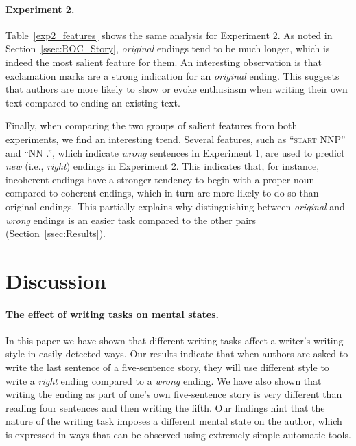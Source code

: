\documentclass[11pt,a4paper]{article}
\newcommand{\secref}[1]{Section~\ref{ssec:#1}}
\newcommand{\tabref}[1]{Table~\ref{#1}}
\newcommand{\isectionb}[1]{\section{#1}\label{ssec:#1}}
\begin{document}
\paragraph{Experiment 2.}
\tabref{exp2_features} shows the same analysis for Experiment 2.
As noted in \secref{ROC_Story}, {\it original} endings tend to be much longer, which is indeed the most salient feature for them.
An interesting observation is that exclamation marks are a strong
indication for an  {\it original} ending. 
This suggests that authors are more likely to show or evoke enthusiasm when writing their own text compared to ending an existing text.

Finally, when comparing the two groups of salient features from both experiments, we find an interesting trend.
Several features, such as ``\textsc{start} NNP'' and  ``NN .'', which indicate {\it wrong} sentences in Experiment 1, are used to predict {\it new} (i.e., {\it right}) endings in Experiment 2. 
This indicates that, for instance, incoherent endings have a stronger tendency to begin with a proper noun compared to coherent endings, 
which in turn are more likely to do so than original endings. 
This partially explains why distinguishing between {\it original} and {\it wrong} endings is an easier task compared to the other pairs (\secref{Results}).


\isectionb{Discussion}

\paragraph{The effect of writing tasks on mental states.}
In this paper we have shown that different writing tasks affect a writer's writing style in easily detected ways.
Our results indicate that when authors are asked to write the last
sentence of a five-sentence story, they will use different style to
write a {\it right} ending compared to a {\it wrong} ending. We have
also shown that writing the ending as part of one's own five-sentence story is very different than reading four sentences and then writing the fifth.
Our findings hint that the nature of the writing task imposes a
different mental state on the author, which is expressed in ways that can be observed using extremely simple automatic tools. 
\end{document}
